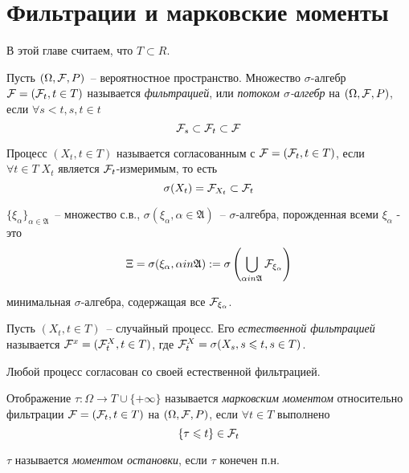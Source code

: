 \section{Фильтрации и марковские моменты}
В этой главе считаем, что $T \subset R$.

\begin{definition}
Пусть $(\Omega, \mathcal{F}, P)$~-- вероятностное пространство. Множество
$\sigma$-алгебр $\mathcal{F} = (\mathcal{F}_t, t \in T)$ называется \emph{фильтрацией},
или \emph{потоком $\sigma$-алгебр} на $(\Omega, \mathcal{F}, P)$, если $\forall s < t, s, t \in t$
$$\mathcal{F}_s \subset \mathcal{F}_t \subset \mathcal{F}$$
\end{definition}
\begin{definition}
Процесс $(X_t, t \in T)$ называется согласованным с $\mathcal{F} = (\mathcal{F}_t, t \in T)$, если
$\forall t \in T \; X_t$ является $\mathcal{F}_t$-измеримым, то есть
$$\sigma(X_t) = \mathcal{F}_{X_t} \subset \mathcal{F}_t$$
\end{definition}


\newcommand{\Alpha}{\mathfrak{A}}

\begin{definition}[обозначения]
$\{\xi_\alpha\}_{\alpha \in \Alpha}$~-- множество с.в., $\sigma(\xi_\alpha, \alpha \in \Alpha)$~--
$\sigma$-алгебра, порожденная всеми $\xi_\alpha$ -  это
$$\Xi = \sigma(\xi_\alpha, \alpha in \Alpha) := \sigma\pars{\mybigcup_{\alpha in \Alpha} \myF_{\xi_\alpha}}$$

минимальная $\sigma$-алгебра, содержащая все $\mathcal{F}_{\xi_\alpha}$.
\end{definition}

\begin{definition}
Пусть $(X_t, t \in T)$~-- случайный процесс. Его \emph{естественной фильтрацией} называется
$\mathcal{F}^x = (\mathcal{F}_t^X, t \in T)$, где $\mathcal{F}_t^X = \sigma(X_s, s \leqslant t, s \in T)$.
\end{definition}
\begin{remark}[наблюдение]
Любой процесс согласован со своей естественной фильтрацией.
\end{remark}

\begin{definition}
Отображение $\tau: \Omega \to T \cup \{+\infty\}$ называется
\emph{марковским моментом} относительно фильтрации $\mathcal{F} = (\mathcal{F}_t, t \in T)$
на $(\Omega, \mathcal{F}, P)$, если $\forall t \in T$ выполнено
$$\{\tau \leqslant t\} \in \mathcal{F}_t$$

$\tau$ называется \emph{моментом остановки}, если $\tau$ конечен п.н.
\end{definition}

